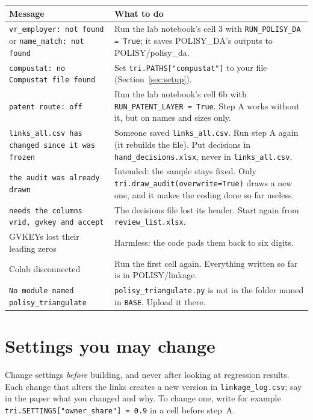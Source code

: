 \documentclass[11pt,a4paper]{article}
\newcommand{\file}[1]{\texttt{#1}}
\begin{document}
\begin{longtable}{@{}L{5.4cm}L{9.6cm}@{}}
\toprule
\textbf{Message} & \textbf{What to do}\\
\midrule\endhead
\bottomrule\endfoot
\texttt{vr\_employer: not found} or \texttt{name\_match: not found} & Run the lab notebook's cell 3 with \texttt{RUN\_POLISY\_DA = True}; it saves POLISY\_DA's outputs to POLISY/polisy\_da.\\
\texttt{compustat: no Compustat file found} & Set \texttt{tri.PATHS["compustat"]} to your file (Section~\ref{sec:setup}).\\
\texttt{patent route: off} & Run the lab notebook's cell 6b with \texttt{RUN\_PATENT\_LAYER = True}. Step A works without it, but on names and sizes only.\\
\texttt{links\_all.csv has changed since it was frozen} & Someone saved \file{links\_all.csv}. Run step A again (it rebuilds the file). Put decisions in \file{hand\_decisions.xlsx}, never in \file{links\_all.csv}.\\
\texttt{the audit was already drawn} & Intended: the sample stays fixed. Only \texttt{tri.draw\_audit(overwrite=True)} draws a new one, and it makes the coding done so far useless.\\
\texttt{needs the columns vrid, gvkey and accept} & The decisions file lost its header. Start again from \file{review\_list.xlsx}.\\
GVKEYs lost their leading zeros & Harmless: the code pads them back to six digits.\\
Colab disconnected & Run the first cell again. Everything written so far is in POLISY/linkage.\\
\texttt{No module named polisy\_triangulate} & \file{polisy\_triangulate.py} is not in the folder named in \texttt{BASE}. Upload it there.\\
\end{longtable}

\section{Settings you may change}\label{sec:settings}

Change settings \emph{before} building, and never after looking at regression results. Each change that alters the links creates a new version in \file{linkage\_log.csv}; say in the paper what you changed and why. To change one, write for example \texttt{tri.SETTINGS["owner\_share"] = 0.9} in a cell before step~A.
\end{document}
